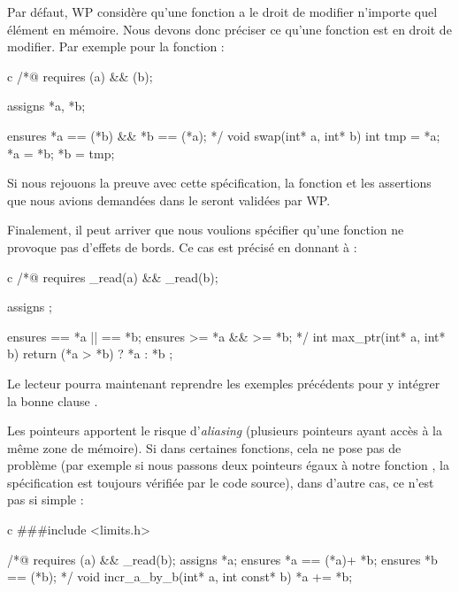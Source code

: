 Par défaut, WP considère qu'une fonction a le droit de modifier n'importe quel
élément en mémoire. Nous devons donc préciser ce qu'une fonction est en droit 
de modifier. Par exemple pour la fonction  :



\begin{CodeBlock}{c}
/*@
  requires \valid(a) && \valid(b);
 
  assigns *a, *b;

  ensures  *a == \old(*b) && *b == \old(*a);
*/
void swap(int* a, int* b){
  int tmp = *a;
  *a = *b;
  *b = tmp;
}
\end{CodeBlock}



Si nous rejouons la preuve avec cette spécification, la fonction et les 
assertions que nous avions demandées dans le  seront validées par WP.



Finalement, il peut arriver que nous voulions spécifier qu'une fonction ne 
provoque pas d'effets de bords. Ce cas est précisé en donnant 
à  :



\begin{CodeBlock}{c}
/*@
  requires \valid_read(a) && \valid_read(b);

  assigns  \nothing;

  ensures \result == *a || \result == *b;
  ensures \result >= *a && \result >= *b;
*/
int max_ptr(int* a, int* b){
  return (*a > *b) ? *a : *b ;
}
\end{CodeBlock}



Le lecteur pourra maintenant reprendre les exemples précédents pour y intégrer 
la bonne clause  .





Les pointeurs apportent le risque d'\textit{aliasing} (plusieurs pointeurs ayant accès à
la même zone de mémoire). Si dans certaines fonctions, cela ne pose pas de 
problème (par exemple si nous passons deux pointeurs égaux
à notre fonction , la spécification est toujours vérifiée par le 
code source), dans d'autre cas, ce n'est pas si simple :



\begin{CodeBlock}{c}
###include <limits.h>

/*@
  requires \valid(a) && \valid_read(b);
  assigns  *a;
  ensures  *a == \old(*a)+ *b;
  ensures  *b == \old(*b);
*/
void incr_a_by_b(int* a, int const* b){
  *a += *b;
}
\end{CodeBlock}



